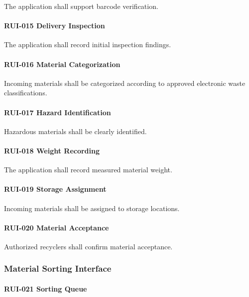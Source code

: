The application shall support barcode verification.

\paragraph{RUI-015 Delivery Inspection}

The application shall record initial inspection findings.

\paragraph{RUI-016 Material Categorization}

Incoming materials shall be categorized according to approved
electronic waste classifications.

\paragraph{RUI-017 Hazard Identification}

Hazardous materials shall be clearly identified.

\paragraph{RUI-018 Weight Recording}

The application shall record measured material weight.

\paragraph{RUI-019 Storage Assignment}

Incoming materials shall be assigned to storage locations.

\paragraph{RUI-020 Material Acceptance}

Authorized recyclers shall confirm material acceptance.


\subsubsection*{Material Sorting Interface}

\paragraph{RUI-021 Sorting Queue}

